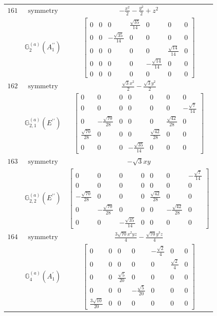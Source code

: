 \documentclass[fleqn,8pt,landscape]{jsarticle}
\begin{document}
\begin{longtable}{ccc}
$ 161 $ & $ \text{symmetry} $ & $ - \frac{x^{2}}{2} - \frac{y^{2}}{2} + z^{2} $ \\
$  $ & $ \mathbb{G}_{2}^{(a)}(A_{1}^{\prime\prime}) $ & $ \begin{bmatrix} 0 & 0 & 0 & \frac{\sqrt{35}}{14} & 0 & 0 & 0 \\ 0 & 0 & - \frac{\sqrt{35}}{14} & 0 & 0 & 0 & 0 \\ 0 & 0 & 0 & 0 & 0 & \frac{\sqrt{14}}{14} & 0 \\ 0 & 0 & 0 & 0 & - \frac{\sqrt{14}}{14} & 0 & 0 \\ 0 & 0 & 0 & 0 & 0 & 0 & 0 \end{bmatrix} $ \\ \hline
$ 162 $ & $ \text{symmetry} $ & $ \frac{\sqrt{3} x^{2}}{2} - \frac{\sqrt{3} y^{2}}{2} $ \\
$  $ & $ \mathbb{G}_{2,1}^{(a)}(E^{\prime\prime}) $ & $ \begin{bmatrix} 0 & 0 & 0 & 0 & 0 & 0 & 0 \\ 0 & 0 & 0 & 0 & 0 & 0 & - \frac{\sqrt{7}}{14} \\ 0 & - \frac{\sqrt{70}}{28} & 0 & 0 & 0 & \frac{\sqrt{42}}{28} & 0 \\ \frac{\sqrt{70}}{28} & 0 & 0 & 0 & \frac{\sqrt{42}}{28} & 0 & 0 \\ 0 & 0 & 0 & - \frac{\sqrt{35}}{14} & 0 & 0 & 0 \end{bmatrix} $ \\ \hline
$ 163 $ & $ \text{symmetry} $ & $ - \sqrt{3} x y $ \\
$  $ & $ \mathbb{G}_{2,2}^{(a)}(E^{\prime\prime}) $ & $ \begin{bmatrix} 0 & 0 & 0 & 0 & 0 & 0 & - \frac{\sqrt{7}}{14} \\ 0 & 0 & 0 & 0 & 0 & 0 & 0 \\ - \frac{\sqrt{70}}{28} & 0 & 0 & 0 & \frac{\sqrt{42}}{28} & 0 & 0 \\ 0 & - \frac{\sqrt{70}}{28} & 0 & 0 & 0 & - \frac{\sqrt{42}}{28} & 0 \\ 0 & 0 & - \frac{\sqrt{35}}{14} & 0 & 0 & 0 & 0 \end{bmatrix} $ \\ \hline
$ 164 $ & $ \text{symmetry} $ & $ \frac{3 \sqrt{70} x^{2} y z}{4} - \frac{\sqrt{70} y^{3} z}{4} $ \\
$  $ & $ \mathbb{G}_{4}^{(a)}(A_{1}^{\prime}) $ & $ \begin{bmatrix} 0 & 0 & 0 & 0 & - \frac{\sqrt{2}}{4} & 0 & 0 \\ 0 & 0 & 0 & 0 & 0 & \frac{\sqrt{2}}{4} & 0 \\ 0 & 0 & \frac{\sqrt{5}}{20} & 0 & 0 & 0 & 0 \\ 0 & 0 & 0 & - \frac{\sqrt{5}}{20} & 0 & 0 & 0 \\ \frac{3 \sqrt{10}}{20} & 0 & 0 & 0 & 0 & 0 & 0 \end{bmatrix} $ \\ \hline

\end{longtable}
\end{document}
